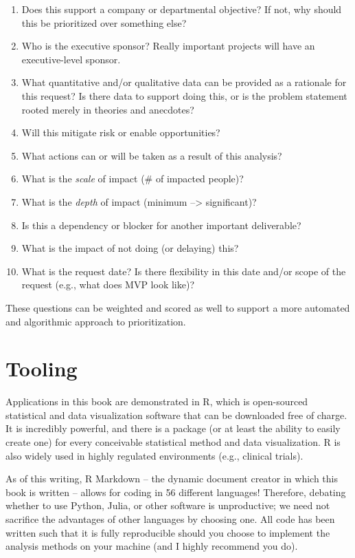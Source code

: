 \documentclass[
]{book}
\providecommand{\tightlist}{%
  \setlength{\itemsep}{0pt}\setlength{\parskip}{0pt}}
\begin{document}
\begin{enumerate}
\def\labelenumi{\arabic{enumi}.}
\tightlist
\item
  Does this support a company or departmental objective? If not, why should this be prioritized over something else?
\item
  Who is the executive sponsor? Really important projects will have an executive-level sponsor.
\item
  What quantitative and/or qualitative data can be provided as a rationale for this request? Is there data to support doing this, or is the problem statement rooted merely in theories and anecdotes?
\item
  Will this mitigate risk or enable opportunities?
\item
  What actions can or will be taken as a result of this analysis?
\item
  What is the \emph{scale} of impact (\# of impacted people)?
\item
  What is the \emph{depth} of impact (minimum --\textgreater{} significant)?
\item
  Is this a dependency or blocker for another important deliverable?
\item
  What is the impact of not doing (or delaying) this?
\item
  What is the request date? Is there flexibility in this date and/or scope of the request (e.g., what does MVP look like)?
\end{enumerate}

These questions can be weighted and scored as well to support a more automated and algorithmic approach to prioritization.

\hypertarget{tooling}{%
\section{Tooling}\label{tooling}}

Applications in this book are demonstrated in R, which is open-sourced statistical and data visualization software that can be downloaded free of charge. It is incredibly powerful, and there is a package (or at least the ability to easily create one) for every conceivable statistical method and data visualization. R is also widely used in highly regulated environments (e.g., clinical trials).

As of this writing, R Markdown -- the dynamic document creator in which this book is written -- allows for coding in 56 different languages! Therefore, debating whether to use Python, Julia, or other software is unproductive; we need not sacrifice the advantages of other languages by choosing one. All code has been written such that it is fully reproducible should you choose to implement the analysis methods on your machine (and I highly recommend you do).
\end{document}
